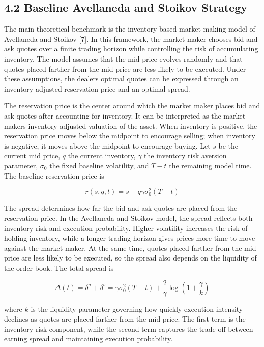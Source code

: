 \documentclass[12pt,a4paper]{article}
\begin{document}
\subsection{4.2 Baseline Avellaneda and Stoikov
Strategy}\label{baseline-avellaneda-and-stoikov-strategy}

The main theoretical benchmark is the inventory based market-making
model of Avellaneda and Stoikov {[}7{]}. In this framework, the market
maker chooses bid and ask quotes over a finite trading horizon while
controlling the risk of accumulating inventory. The model assumes that
the mid price evolves randomly and that quotes placed farther from the
mid price are less likely to be executed. Under these assumptions, the
dealer\textquotesingle s optimal quotes can be expressed through an
inventory adjusted reservation price and an optimal spread.

The reservation price is the center around which the market maker places
bid and ask quotes after accounting for inventory. It can be interpreted
as the market maker\textquotesingle s inventory adjusted valuation of
the asset. When inventory is positive, the reservation price moves below
the midpoint to encourage selling; when inventory is negative, it moves
above the midpoint to encourage buying. Let \(s\) be the current mid
price, \(q\) the current inventory, \(\gamma\) the inventory risk
aversion parameter, \(\sigma_0\) the fixed baseline volatility, and
\(T-t\) the remaining model time. The baseline reservation price is

\[
r(s,q,t)=s-q\gamma\sigma_0^2(T-t)
\]

The spread determines how far the bid and ask quotes are placed from the
reservation price. In the Avellaneda and Stoikov model, the spread
reflects both inventory risk and execution probability. Higher
volatility increases the risk of holding inventory, while a longer
trading horizon gives prices more time to move against the market maker.
At the same time, quotes placed farther from the mid price are less
likely to be executed, so the spread also depends on the liquidity of
the order book. The total spread is

\[
\Delta(t)=\delta^a+\delta^b=\gamma\sigma_0^2(T-t)+\frac{2}{\gamma}\log\left(1+\frac{\gamma}{k}\right)
\]

where \(k\) is the liquidity parameter governing how quickly execution
intensity declines as quotes are placed farther from the mid price. The
first term is the inventory risk component, while the second term
captures the trade-off between earning spread and maintaining execution
probability.
\end{document}
